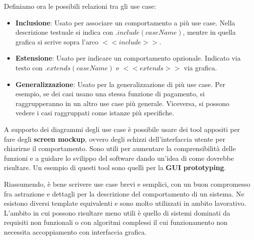 \noindent Definiamo ora le possibili relazioni tra gli use case: \begin{itemize}
	\item \textbf{Inclusione}: Usato per associare un comportamento a più use case. Nella descrizione testuale si indica con $.include(caseName)$,
	mentre in quella grafica si scrive sopra l'arco $<<include>>$.
	\item \textbf{Estensione}: Usato per indicare un comportamento opzionale. Indicato via testo con $.extends(caseName)$ e $<<extends>>$ via grafica.
	\item \textbf{Generalizzazione}: Usato per la generalizzazione di più use case. Per esempio, se dei casi usano una stessa funzione di pagamento, si
	raggrupperanno in un altro use case più generale. Viceversa, si possono vedere i casi raggruppati come istanze più specifiche.
\end{itemize}
\noindent A supporto dei diagrammi degli use case è possibile usare dei tool appositi per fare degli \textbf{screen mockup}, ovvero degli schizzi
dell'interfaccia utente per chiarirne il comportamento. Sono utili per aumentare la comprensibilità delle funzioni e a guidare lo svilippo del software
dando un'idea di come dovrebbe risultare. Un esempio di questi tool sono quelli per la \textbf{GUI prototyping}.\par
Riassumendo, è bene scrivere use case brevi e semplici, con un buon compromesso fra astrazione e dettagli per la descrizione del comportamento di un
sistema. Ne esistono diversi template equivalenti e sono molto utilizzati in ambito lavorativo. L'ambito in cui possono risultare meno utili è quello
di sistemi dominati da requisiti non funzionali o con algoritmi complessi il cui funzionamento non necessita accoppiamento con interfaccia grafica.